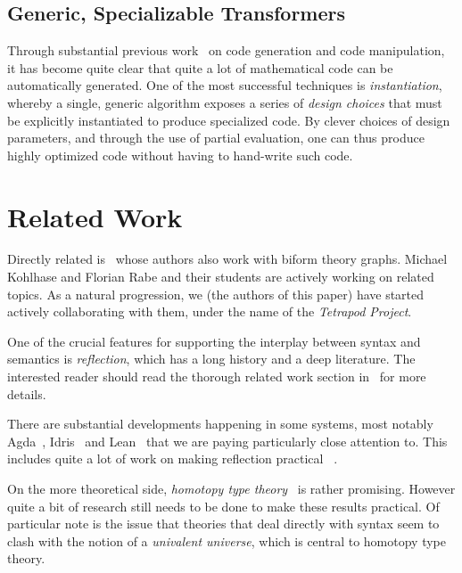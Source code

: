 \documentclass[fleqn]{llncs}
\begin{document}
\subsection*{Generic, Specializable Transformers}

Through substantial previous work~%
\cite{CaretteKS09,Carette06,CaElSm11,MathSchemeExper,CaretteKiselyov2005,CaretteKiselyov11,CaretteKucera07,CaretteKucera11,carette2016simplifying,KuceraCarette06,Larjani13,narayanan2016probabilistic}
on code generation and code manipulation, it has become quite clear that
quite a lot of mathematical code can be automatically generated.
One of the most successful techniques is \emph{instantiation},
whereby a single, generic algorithm exposes a series of
\emph{design choices} that must be explicitly instantiated to produce
specialized code. By clever choices of design parameters, and through the
use of partial evaluation, one can thus produce highly optimized code
without having to hand-write such code.

\section{Related Work}

Directly related is~\cite{KohlhaseManceRabe13} whose authors also work
with biform theory graphs. Michael Kohlhase and Florian Rabe and their
students are actively working on related topics. As a natural
progression, we (the authors of this paper) have started actively
collaborating with them, under the name of the \emph{Tetrapod
  Project}.

One of the crucial features for supporting the interplay between
syntax and semantics is \emph{reflection}, which has a long history
and a deep literature. The interested reader should read the 
thorough related work section in~\cite{Farmer18} for more details.

There are substantial developments happening in some systems, most
notably Agda~\cite{Norell07,Norell09}, Idris~\cite{Brady13} and
Lean~\cite{Lean} that we are paying particularly close attention to.  This includes
quite a lot of work on making reflection practical~%
\cite{Christiansen:2016,Christiansen:2014,ebner2017metaprogramming,VanDerWalt12}.

On the more theoretical side, \emph{homotopy type theory}~\cite{hottbook}
is rather promising.  However quite a bit of research still needs to be
done to make these results practical. Of particular note is the issue
that theories that deal directly with syntax seem to clash with the
notion of a \emph{univalent universe}, which is central to homotopy
type theory.
\end{document}
